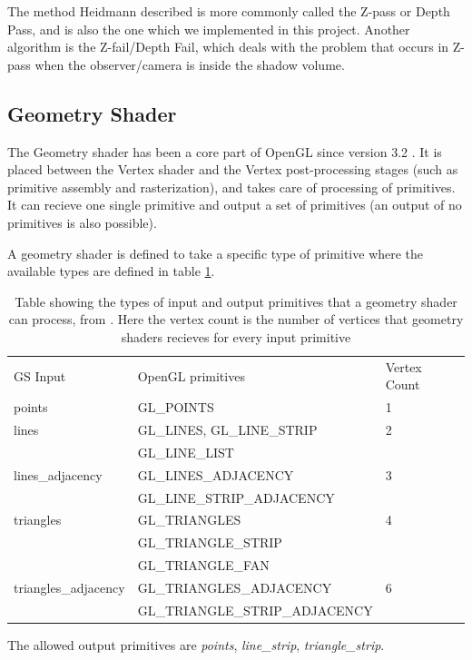 \documentclass[a4paper, 12pt]{article}
\newcommand{\headcol}{\rowcolor{tableheadcolor}} %
\newcommand{\rowcol}{\rowcolor{tablerowcolor}} %
\begin{document}
The method Heidmann described is more commonly called the Z-pass or Depth Pass, and is also the one which we implemented in this project. Another algorithm is the Z-fail/Depth Fail, which deals with the problem that occurs in Z-pass when the observer/camera is inside the shadow volume. 
\subsection{Geometry Shader}
The Geometry shader has been a core part of OpenGL since version 3.2 \cite{GEOM}. It is placed between the Vertex shader and the Vertex post-processing stages (such as primitive assembly and rasterization), and takes care of processing of primitives. It can recieve one single primitive and output a set of primitives (an output of no primitives is also possible).

A geometry shader is defined to take a specific type of primitive where the available types are defined in table \ref{tab:GSprimitives}.

\begin{table}
\centering
\caption{Table showing the types of input and output primitives that a geometry shader can process, from \cite{GEOM}. Here the vertex count is the number of vertices that geometry shaders recieves for every input primitive }
\label{tab:GSprimitives}
\begin{tabular}{lll} \toprule
GS Input & OpenGL primitives & Vertex Count \\\headcol \midrule
\headcol points& GL\_POINTS​&1\\
\rowcol lines& GL\_LINES​, GL\_LINE\_STRIP​​&2\\
\rowcol &  GL\_LINE\_LIST&\\
\headcol lines\_adjacency&GL\_LINES\_ADJACENCY​&​3\\
\headcol & GL\_LINE\_STRIP\_ADJACENCY&\\
\rowcol triangles&GL\_TRIANGLES​​&4\\
\rowcol & GL\_TRIANGLE\_STRIP​&\\
\rowcol &GL\_TRIANGLE\_FAN&\\
\headcol triangles\_adjacency&GL\_TRIANGLES\_ADJACENCY​​&6\\
\headcol & GL\_TRIANGLE\_STRIP\_ADJACENCY&\\\midrule
\end{tabular}
\end{table}

The allowed output primitives are \emph{points}, \emph{line\_strip}, \emph{triangle\_strip}.
\end{document}
